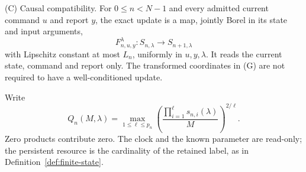 \smallskip\noindent\textup{(C) Causal compatibility.}
For $0\le n<N-1$ and every admitted current command $u$ and report $y$, the exact update
is a map, jointly Borel in its state and input arguments,
\[
 F_{n,u,y}^{\lambda}:S_{n,\lambda}\longrightarrow S_{n+1,\lambda}
\]
with Lipschitz constant at most $L_n$, uniformly in $u,y,\lambda$.
It reads the current state, command and report only. The transformed
coordinates in (G) are not required to have a well-conditioned update.

Write
\begin{equation}\label{eq:transfer-profile}
 Q_n(M,\lambda)=\max_{1\le\ell\le p_n}
       \left(\frac{\prod_{i=1}^{\ell}s_{n,i}(\lambda)}{M}
       \right)^{2/\ell}.
\end{equation}
Zero products contribute zero. The clock and the known parameter are
read-only; the persistent resource is the cardinality of the retained
label, as in Definition~\ref{def:finite-state}.

